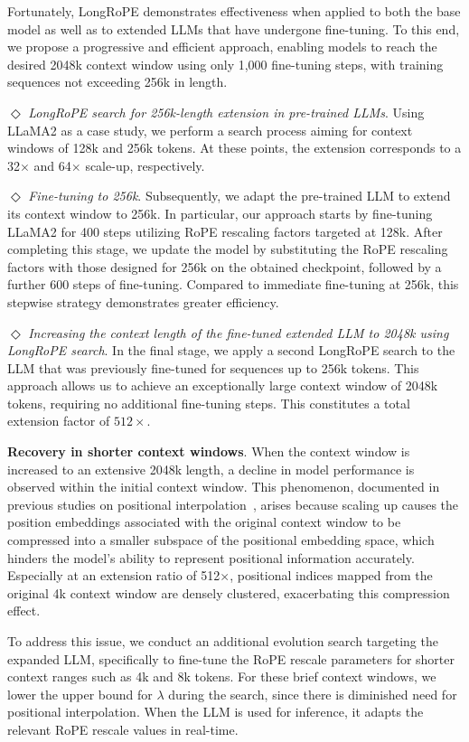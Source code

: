 Fortunately, LongRoPE demonstrates effectiveness when applied to both the base model as well as to extended LLMs that have undergone fine-tuning. To this end, we propose a progressive and efficient approach, enabling models to reach the desired 2048k context window using only 1,000 fine-tuning steps, with training sequences not exceeding 256k in length.

$\Diamond$ \textit{LongRoPE search for 256k-length extension in pre-trained LLMs}. Using LLaMA2 as a case study, we perform a search process aiming for context windows of 128k and 256k tokens. At these points, the extension corresponds to a 32$\times$ and 64$\times$ scale-up, respectively.

$\Diamond$ \textit{Fine-tuning to 256k}. Subsequently, we adapt the pre-trained LLM to extend its context window to 256k. In particular, our approach starts by fine-tuning LLaMA2 for 400 steps utilizing RoPE rescaling factors targeted at 128k. After completing this stage, we update the model by substituting the RoPE rescaling factors with those designed for 256k on the obtained checkpoint, followed by a further 600 steps of fine-tuning. Compared to immediate fine-tuning at 256k, this stepwise strategy demonstrates greater efficiency.

$\Diamond$ \textit{Increasing the context length of the fine-tuned extended LLM to 2048k using LongRoPE search}. In the final stage, we apply a second LongRoPE search to the LLM that was previously fine-tuned for sequences up to 256k tokens. This approach allows us to achieve an exceptionally large context window of 2048k tokens, requiring no additional fine-tuning steps. This constitutes a total extension factor of $512\times$.

\textbf{Recovery in shorter context windows}. When the context window is increased to an extensive 2048k length, a decline in model performance is observed within the initial context window. This phenomenon, documented in previous studies on positional interpolation~\cite{pi}, arises because scaling up causes the position embeddings associated with the original context window to be compressed into a smaller subspace of the positional embedding space, which hinders the model’s ability to represent positional information accurately. Especially at an extension ratio of 512$\times$, positional indices mapped from the original 4k context window are densely clustered, exacerbating this compression effect.

To address this issue, we conduct an additional evolution search targeting the expanded LLM, specifically to fine-tune the RoPE rescale parameters for shorter context ranges such as 4k and 8k tokens. For these brief context windows, we lower the upper bound for $\lambda$ during the search, since there is diminished need for positional interpolation. When the LLM is used for inference, it adapts the relevant RoPE rescale values in real-time.

